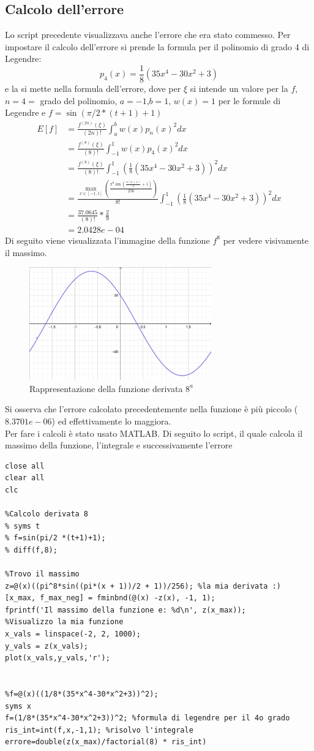 \documentclass[11pt]{article}
\begin{document}
\subsection{Calcolo dell'errore}
Lo script precedente visualizzava anche l'errore che era stato commesso. Per impostare il calcolo dell'errore si prende la formula per il polinomio di grado 4 di Legendre:
\[
p_4(x)=\frac{1}{8}(35x^4-30x^2+3)
\]
e la si mette nella formula dell'errore, dove per $\xi$ si intende un valore per la $f$, $n=4=$ grado del polinomio, $a=-1$,$b=1$, $w(x)=1$ per le formule di Legendre e  $f=\sin(\pi/2 *(t+1)+1)$
\begin{align*}
	E[f]&=\frac{f^{(2n)}(\xi)}{(2n)!}\int_a^bw(x)p_n(x)^2dx\\
	&=\frac{f^{(8)}(\xi)}{(8)!}\int_{-1}^1w(x)p_4(x)^2dx\\
	&=\frac{f^{(8)}(\xi)}{(8)!}\int_{-1}^1({\frac{1}{8}(35x^4-30x^2+3)})^2dx\\
	&=\frac{\max_{x\in[-1,1]}(\frac{\pi^8\sin(\frac{\pi(x + 1)}{2} + 1)}{256})}{8!}\int_{-1}^1({\frac{1}{8}(35x^4-30x^2+3)})^2dx\\
	&=\frac{37.0645}{(8)!}*\frac{2}{9}\\
	&=2.0428e-04
\end{align*}
Di seguito viene visualizzata l'immagine della funzione $f^8$ per vedere visivamente il massimo. 
\begin{figure}[H]
  \centering
  \includegraphics[width=0.7\textwidth]{images/errore.png} 
  \caption{Rappresentazione della funzione derivata $8^a$}
  \label{fig:funzione}
\end{figure}
Si osserva che l'errore calcolato precedentemente nella funzione è più piccolo ($8.3701e-06$) ed effettivamente lo maggiora.\\
Per fare i calcoli è stato usato MATLAB. Di seguito lo script, il quale calcola il massimo della funzione, l'integrale e successivamente l'errore
\begin{lstlisting}
close all
clear all
clc

%Calcolo derivata 8
% syms t
% f=sin(pi/2 *(t+1)+1);
% diff(f,8); 

%Trovo il massimo
z=@(x)((pi^8*sin((pi*(x + 1))/2 + 1))/256); %la mia derivata :)
[x_max, f_max_neg] = fminbnd(@(x) -z(x), -1, 1);
fprintf('Il massimo della funzione e: %d\n', z(x_max));
%Visualizzo la mia funzione
x_vals = linspace(-2, 2, 1000);
y_vals = z(x_vals); 
plot(x_vals,y_vals,'r');


%f=@(x)((1/8*(35*x^4-30*x^2+3))^2);
syms x
f=(1/8*(35*x^4-30*x^2+3))^2; %formula di legendre per il 4o grado
ris_int=int(f,x,-1,1); %risolvo l'integrale
errore=double(z(x_max)/factorial(8) * ris_int)
\end{lstlisting}
\end{document}
